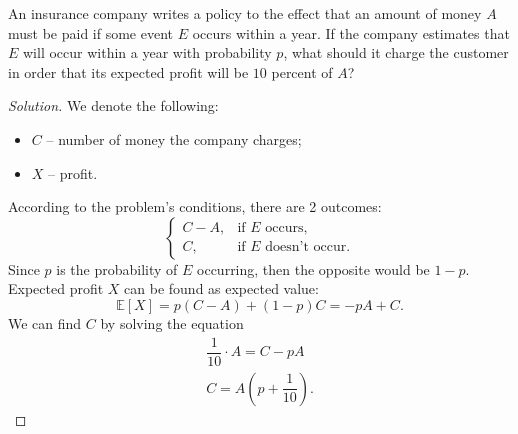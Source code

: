 \documentclass{article}[12pt]
\newenvironment{solution}
  {\renewcommand\qedsymbol{$\blacksquare$}\begin{proof}[Solution]}
  {\end{proof}}
\newenvironment{problem}[1]
  {\renewcommand\theinnercustomprblm{#1}\innercustomprblm}
  {\endinnercustomprblm}
\newcommand{\E}{\mathbb{E}}
\begin{document}
\begin{problem}{4.27}\normalfont
An insurance company writes a policy to the effect that an amount of money $A$ must be paid if some event $E$ occurs within a year. 
If the company estimates that $E$ will occur within a year with probability $p$, what should it charge the customer in order that its expected profit will be $10$ percent of $A$?
\end{problem}
\begin{solution}
We denote the following:
\begin{itemize}
    \item $C$ -- number of money the company charges;
    \item $X$ -- profit.
\end{itemize}
According to the problem's conditions, there are 2 outcomes:
\begin{equation*}
    \begin{cases}
        C - A,& \text{if $E$ occurs},
        \\
        C,& \text{if $E$ doesn't occur}.
    \end{cases}
\end{equation*}
Since $p$ is the probability of $E$ occurring, then the opposite would be $1 - p$.
Expected profit $X$ can be found as expected value:
\begin{equation*}
    \E[X] = p(C - A) + (1 - p)C = -pA + C.
\end{equation*}
We can find $C$ by solving the equation
\begin{gather*}
    \dfrac{1}{10}\cdot A = C - pA
    \\
    C = A\left(p + \dfrac{1}{10}\right).
\end{gather*}
\end{solution}
\end{document}
